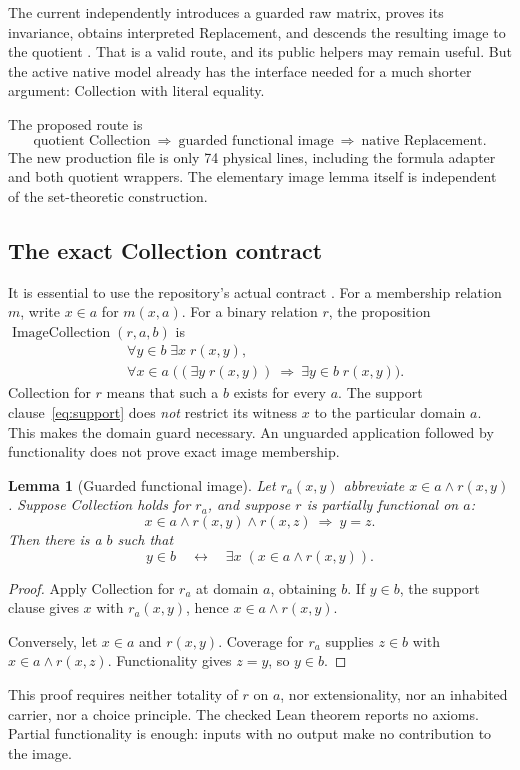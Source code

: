\documentclass[11pt,a4paper]{article}
\newcommand{\code}[1]{\texttt{\detokenize{#1}}}
\newtheorem{lemma}[theorem]{Lemma}
\theoremstyle{remark}
\begin{document}
The current \code{KQ1Replacement} independently introduces a guarded raw
matrix, proves its invariance, obtains interpreted Replacement, and descends
the resulting image to the quotient \cite{oldreplacement}. That is a valid
route, and its public helpers may remain useful. But the active native model
already has the interface needed for a much shorter argument:
Collection with literal equality.

The proposed route is
\[
 \text{quotient Collection}
 \ \Longrightarrow\
 \text{guarded functional image}
 \ \Longrightarrow\
 \text{native Replacement}.
\]
The new production file is only 74 physical lines, including the formula
adapter and both quotient wrappers. The elementary image lemma itself is
independent of the set-theoretic construction.

\subsection{The exact Collection contract}
It is essential to use the repository's actual contract
\cite{profilecollection}. For a membership relation \(m\), write \(x\in a\)
for \(m(x,a)\). For a binary relation \(r\), the proposition
\(\operatorname{ImageCollection}(r,a,b)\) is
\begin{align}
 &\forall y\in b\;\exists x\;r(x,y), \label{eq:support}\\
 &\forall x\in a\;
   \bigl((\exists y\;r(x,y))\ \Longrightarrow\
         \exists y\in b\;r(x,y)\bigr). \label{eq:coverage}
\end{align}
Collection for \(r\) means that such a \(b\) exists for every \(a\).
The support clause~\eqref{eq:support} does \emph{not} restrict its witness
\(x\) to the particular domain \(a\). This makes the domain guard necessary.
An unguarded application followed by functionality does not prove exact
image membership.

\begin{lemma}[Guarded functional image]
\label{lem:image}
Let \(r_a(x,y)\) abbreviate \(x\in a\land r(x,y)\).
Suppose Collection holds for \(r_a\), and suppose \(r\) is partially
functional on \(a\):
\[
 x\in a\land r(x,y)\land r(x,z)\ \Longrightarrow\ y=z.
\]
Then there is a \(b\) such that
\[
 y\in b \quad\longleftrightarrow\quad
 \exists x\;(x\in a\land r(x,y)).
\]
\end{lemma}
\begin{proof}
Apply Collection for \(r_a\) at domain \(a\), obtaining \(b\).
If \(y\in b\), the support clause gives \(x\) with
\(r_a(x,y)\), hence \(x\in a\land r(x,y)\).

Conversely, let \(x\in a\) and \(r(x,y)\). Coverage for \(r_a\) supplies
\(z\in b\) with \(x\in a\land r(x,z)\). Functionality gives \(z=y\),
so \(y\in b\).
\end{proof}
This proof requires neither totality of \(r\) on \(a\), nor extensionality,
nor an inhabited carrier, nor a choice principle. The checked Lean
\code{exact_image} theorem reports no axioms. Partial functionality is enough:
inputs with no output make no contribution to the image.
\end{document}

